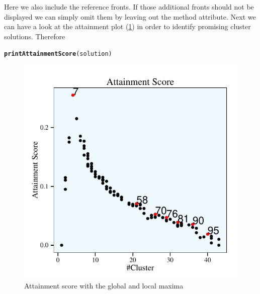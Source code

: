 \documentclass[parskip=half,DIV=14]{scrartcl}\usepackage[]{graphicx}\usepackage[]{color}
\makeatletter
\def\maxwidth{ %
  \ifdim\Gin@nat@width>\linewidth
    \linewidth
  \else
    \Gin@nat@width
  \fi
}
\newcommand{\hlstd}[1]{\textcolor[rgb]{0.345,0.345,0.345}{#1}}%
\newcommand{\hlkwd}[1]{\textcolor[rgb]{0.737,0.353,0.396}{\textbf{#1}}}%
\newenvironment{kframe}{%
 \def\at@end@of@kframe{}%
 \ifinner\ifhmode%
  \def\at@end@of@kframe{\end{minipage}}%
  \begin{minipage}{\columnwidth}%
 \fi\fi%
 \def\FrameCommand##1{\hskip\@totalleftmargin \hskip-\fboxsep
 \colorbox{shadecolor}{##1}\hskip-\fboxsep
     \hskip-\linewidth \hskip-\@totalleftmargin \hskip\columnwidth}%
 \MakeFramed {\advance\hsize-\width
   \@totalleftmargin\z@ \linewidth\hsize
   \@setminipage}}%
 {\par\unskip\endMakeFramed%
 \at@end@of@kframe}
\newenvironment{knitrout}{}{} %
\makeatother
\begin{document}
Here we also include the reference fronts. If those additional fronts should not be displayed we can simply omit them by leaving out the method attribute. Next we can have a look at the attainment plot (\ref{fig:attainment}) in order to identify promising cluster solutions. Therefore 
\begin{knitrout}
\color{fgcolor}\begin{kframe}
\begin{alltt}
\hlkwd{printAttainmentScore}\hlstd{(solution)}
\end{alltt}
\end{kframe}
\end{knitrout}
\begin{figure}
\begin{center}
\begin{knitrout}
\color{fgcolor}

{\centering \includegraphics[width=\maxwidth]{figures/plots-attainment-1} 

}



\end{knitrout}
\caption{Attainment score with the global and local maxima}
\label{fig:attainment}
\end{center}
\end{figure}
\end{document}
